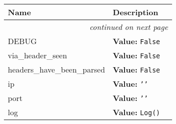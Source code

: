     \vspace{-1cm}
\hspace{\varindent}\begin{longtable}{|p{\varnamewidth}|p{\vardescrwidth}|l}
\cline{1-2}
\cline{1-2} \centering \textbf{Name} & \centering \textbf{Description}& \\
\cline{1-2}
\endhead\cline{1-2}\multicolumn{3}{r}{\small\textit{continued on next page}}\\\endfoot\cline{1-2}
\endlastfoot\raggedright D\-E\-B\-U\-G\- & \raggedright \textbf{Value:} 
{\tt False}&\\
\cline{1-2}
\raggedright v\-i\-a\-\_\-h\-e\-a\-d\-e\-r\-\_\-s\-e\-e\-n\- & \raggedright \textbf{Value:} 
{\tt False}&\\
\cline{1-2}
\raggedright h\-e\-a\-d\-e\-r\-s\-\_\-h\-a\-v\-e\-\_\-b\-e\-e\-n\-\_\-p\-a\-r\-s\-e\-d\- & \raggedright \textbf{Value:} 
{\tt False}&\\
\cline{1-2}
\raggedright i\-p\- & \raggedright \textbf{Value:} 
{\tt \texttt{'}\texttt{}\texttt{'}}&\\
\cline{1-2}
\raggedright p\-o\-r\-t\- & \raggedright \textbf{Value:} 
{\tt \texttt{'}\texttt{}\texttt{'}}&\\
\cline{1-2}
\raggedright l\-o\-g\- & \raggedright \textbf{Value:} 
{\tt Log()}&\\
\cline{1-2}
\end{longtable}

